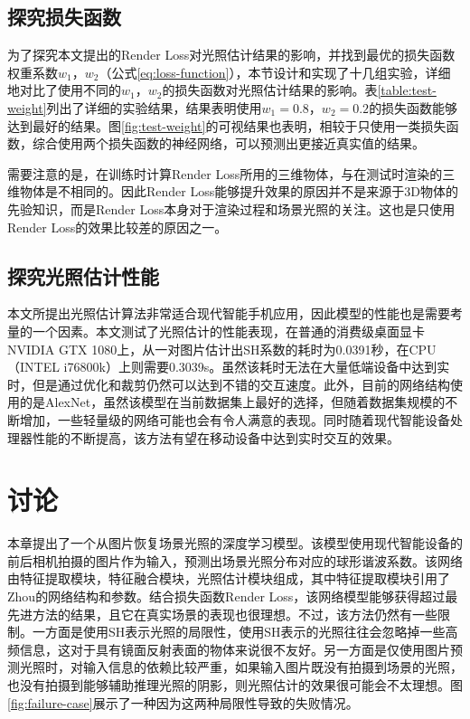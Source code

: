 \subsection{探究损失函数}

为了探究本文提出的Render Loss对光照估计结果的影响，并找到最优的损失函数权重系数$w_1$，$w_2$（公式\ref{eq:loss-function}），本节设计和实现了十几组实验，详细地对比了使用不同的$w_1$，$w_2$的损失函数对光照估计结果的影响。表\ref{table:test-weight}列出了详细的实验结果，结果表明使用$w_1=0.8$，$w_2=0.2$的损失函数能够达到最好的结果。图\ref{fig:test-weight}的可视结果也表明，相较于只使用一类损失函数，综合使用两个损失函数的神经网络，可以预测出更接近真实值的结果。



需要注意的是，在训练时计算Render Loss所用的三维物体，与在测试时渲染的三维物体是不相同的。因此Render Loss能够提升效果的原因并不是来源于3D物体的先验知识，而是Render Loss本身对于渲染过程和场景光照的关注。这也是只使用Render Loss的效果比较差的原因之一。
\subsection{探究光照估计性能}
本文所提出光照估计算法非常适合现代智能手机应用，因此模型的性能也是需要考量的一个因素。本文测试了光照估计的性能表现，在普通的消费级桌面显卡NVIDIA GTX 1080上，从一对图片估计出SH系数的耗时为0.0391秒，在CPU（INTEL i76800k）上则需要0.3039s。虽然该耗时无法在大量低端设备中达到实时，但是通过优化和裁剪仍然可以达到不错的交互速度。此外，目前的网络结构使用的是AlexNet，虽然该模型在当前数据集上最好的选择，但随着数据集规模的不断增加，一些轻量级的网络可能也会有令人满意的表现。同时随着现代智能设备处理器性能的不断提高，该方法有望在移动设备中达到实时交互的效果。
\section{讨论}
本章提出了一个从图片恢复场景光照的深度学习模型。该模型使用现代智能设备的前后相机拍摄的图片作为输入，预测出场景光照分布对应的球形谐波系数。该网络由特征提取模块，特征融合模块，光照估计模块组成，其中特征提取模块引用了Zhou\cite{zhou2017places}的网络结构和参数。结合损失函数Render Loss，该网络模型能够获得超过最先进方法的结果，且它在真实场景的表现也很理想。不过，该方法仍然有一些限制。一方面是使用SH表示光照的局限性，使用SH表示的光照往往会忽略掉一些高频信息，这对于具有镜面反射表面的物体来说很不友好。另一方面是仅使用图片预测光照时，对输入信息的依赖比较严重，如果输入图片既没有拍摄到场景的光照，也没有拍摄到能够辅助推理光照的阴影，则光照估计的效果很可能会不太理想。图\ref{fig:failure-case}展示了一种因为这两种局限性导致的失败情况。


